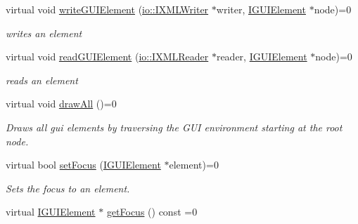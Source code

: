 \begin{DoxyCompactItemize}
\mbox{\label{classirr_1_1gui_1_1IGUIEnvironment_a30fb040bf48603fd309632e9c60b3583}} 
virtual void \hyperlink{classirr_1_1gui_1_1IGUIEnvironment_a30fb040bf48603fd309632e9c60b3583}{write\+G\+U\+I\+Element} (\hyperlink{classirr_1_1io_1_1IXMLWriter}{io\+::\+I\+X\+M\+L\+Writer} $\ast$writer, \hyperlink{classirr_1_1gui_1_1IGUIElement}{I\+G\+U\+I\+Element} $\ast$node)=0
\begin{DoxyCompactList}\small\item\em writes an element \end{DoxyCompactList}\item 
\mbox{\label{classirr_1_1gui_1_1IGUIEnvironment_acdfcdf6330e7475e3fdfd42f43c5f6df}} 
virtual void \hyperlink{classirr_1_1gui_1_1IGUIEnvironment_acdfcdf6330e7475e3fdfd42f43c5f6df}{read\+G\+U\+I\+Element} (\hyperlink{namespaceirr_1_1io_ab620b13630f0818f3eefc000f6917fe4}{io\+::\+I\+X\+M\+L\+Reader} $\ast$reader, \hyperlink{classirr_1_1gui_1_1IGUIElement}{I\+G\+U\+I\+Element} $\ast$node)=0
\begin{DoxyCompactList}\small\item\em reads an element \end{DoxyCompactList}\item 
\mbox{\label{classirr_1_1gui_1_1IGUIEnvironment_aa6ba29bbf3121a5954cfa5a9ca72982f}} 
virtual void \hyperlink{classirr_1_1gui_1_1IGUIEnvironment_aa6ba29bbf3121a5954cfa5a9ca72982f}{draw\+All} ()=0
\begin{DoxyCompactList}\small\item\em Draws all gui elements by traversing the G\+UI environment starting at the root node. \end{DoxyCompactList}\item 
virtual bool \hyperlink{classirr_1_1gui_1_1IGUIEnvironment_a2bfe9985ae1a2f379e708fce86902cea}{set\+Focus} (\hyperlink{classirr_1_1gui_1_1IGUIElement}{I\+G\+U\+I\+Element} $\ast$element)=0
\begin{DoxyCompactList}\small\item\em Sets the focus to an element. \end{DoxyCompactList}\item 
virtual \hyperlink{classirr_1_1gui_1_1IGUIElement}{I\+G\+U\+I\+Element} $\ast$ \hyperlink{classirr_1_1gui_1_1IGUIEnvironment_a624c047cb88a5d3e3e0d17a42a627335}{get\+Focus} () const =0

\end{DoxyCompactItemize}
